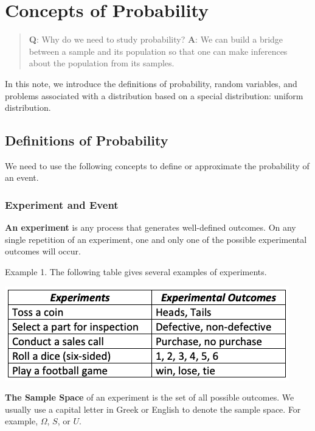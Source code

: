 \documentclass[
]{book}
\begin{document}
\hypertarget{concepts-of-probability}{%
\chapter{Concepts of Probability}\label{concepts-of-probability}}

\hfill\break

\begin{quote}
\textbf{Q}: Why do we need to study probability?
\textbf{A}: We can build a bridge between a sample and its population so that one can make inferences about the population from its samples.
\end{quote}

In this note, we introduce the definitions of probability, random variables, and problems associated with a distribution based on a special distribution: uniform distribution.

\hypertarget{definitions-of-probability}{%
\section{Definitions of Probability}\label{definitions-of-probability}}

We need to use the following concepts to define or approximate the probability of an event.

\hypertarget{experiment-and-event}{%
\subsection{Experiment and Event}\label{experiment-and-event}}

\textbf{An experiment} is any process that generates well-defined outcomes. On any single repetition of an experiment, one and only one of the possible experimental outcomes will occur.

Example 1. The following table gives several examples of experiments.

\begin{center}\includegraphics[width=0.55\linewidth]{week03/experiments} \end{center}

\textbf{The Sample Space} of an experiment is the set of all possible outcomes. We usually use a capital letter in Greek or English to denote the sample space. For example, \(\Omega\), \(S\), or \(U\).
\end{document}
